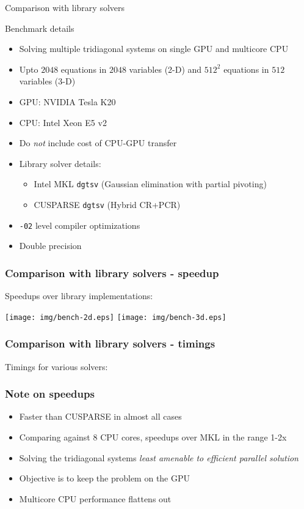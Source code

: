 \begin{frame}{Comparison with library solvers}
\footnotesize
\begin{block}{Benchmark details}
\begin{itemize}
\item Solving multiple tridiagonal systems on single GPU and multicore CPU
\item Upto $2048$ equations in $2048$ variables (2-D)
    and $512^2$ equations in $512$ variables (3-D)
\item GPU: NVIDIA Tesla K20
\item CPU: Intel Xeon E5 v2
\item Do \emph{not} include cost of CPU-GPU transfer
\item Library solver details:
\begin{itemize}
    \footnotesize
    \item Intel MKL \texttt{dgtsv} (Gaussian elimination with partial pivoting)
    \item CUSPARSE \texttt{dgtsv} (Hybrid CR+PCR)
\end{itemize}
\item \texttt{-02} level compiler optimizations
\item Double precision
\end{itemize}
\end{block}
\end{frame}

\begin{frame}
\frametitle{Comparison with library solvers - speedup}
Speedups over library implementations:
\begin{center}
\texttt{[image: img/bench-2d.eps]}
\texttt{[image: img/bench-3d.eps]}
\end{center}
\end{frame}

\begin{frame}
\frametitle{Comparison with library solvers - timings}
Timings for various solvers:
\begin{table}
\resizebox{\textwidth}{!}{%

}
\end{table}
\end{frame}

\begin{frame}
\frametitle{Note on speedups}
\begin{itemize}
\item Faster than CUSPARSE in almost all cases
\item Comparing against 8 CPU cores,
    speedups over MKL in the range 1-2x
\item Solving the tridiagonal systems
    \emph{least amenable to efficient parallel solution}
\item Objective is to keep the problem on the GPU
\item Multicore CPU performance flattens out
\end{itemize}
\end{frame}

